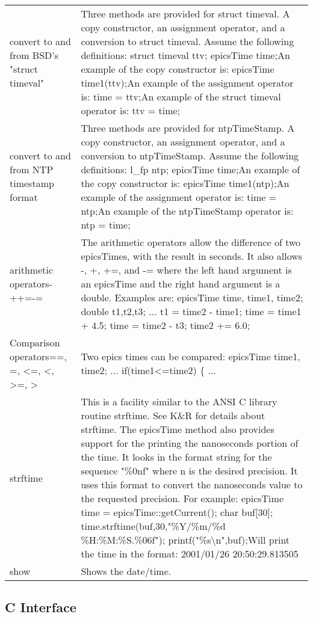 \begin{center}
\begin{longtable}{p{1.95833in}p{4.79167in}}
convert to and from BSD's "struct timeval" & Three methods are provided for struct timeval. A copy constructor, an assignment operator, and a conversion to struct timeval. Assume the following definitions:    struct timeval ttv;    epicsTime time;An example of the copy constructor is:    epicsTime time1(ttv);An example of the assignment operator is:    time = ttv;An example of the struct timeval operator is:    ttv = time;\\
convert to and from NTP timestamp format & Three methods are provided for ntpTimeStamp. A copy constructor, an assignment operator, and a conversion to ntpTimeStamp. Assume the following definitions:    l\_fp ntp;    epicsTime time;An example of the copy constructor is:    epicsTime time1(ntp);An example of the assignment operator is:    time = ntp;An example of the ntpTimeStamp operator is:    ntp = time;\\
arithmetic operators- ++=-= & The arithmetic operators allow the difference of two epicsTimes, with the result in seconds. It also allows -, +, +=, and -= where the left hand argument is an epicsTime and the right hand argument is a double. Examples are:    epicsTime time, time1, time2;    double t1,t2,t3;    ...    t1 = time2 - time1;    time = time1 + 4.5;    time = time2 - t3;    time2 += 6.0;\\
Comparison operators==, \textbar{}=, \textless{}=, \textless{}, \textgreater{}=, \textgreater{} & Two epics times can be compared:    epicsTime time1, time2;    ...    if(time1\textless{}=time2) \{ ...\\
strftime & This is a facility similar to the ANSI C library routine strftime. See K\&R for details about strftime. The epicsTime method also provides support for the printing the nanoseconds portion of the time. It looks in the format string for the sequence "\%0nf" where n is the desired precision. It uses this format to convert the nanoseconds value to the requested precision. For example:    epicsTime time = epicsTime::getCurrent();    char buf[30];    time.strftime(buf,30,"\%Y/\%m/\%d \%H:\%M:\%S.\%06f");    printf("\%s\textbackslash{}n",buf);Will print the time in the format:    2001/01/26 20:50:29.813505\\
show & Shows the date/time.
\end{longtable}\end{center}


\subsection{C Interface}

